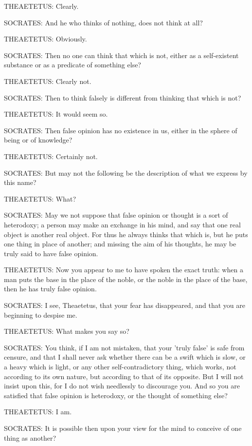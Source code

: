 THEAETETUS: Clearly.

SOCRATES: And he who thinks of nothing, does not think at all?

THEAETETUS: Obviously.

SOCRATES: Then no one can think that which is not, either as a
self-existent substance or as a predicate of something else?

THEAETETUS: Clearly not.

SOCRATES: Then to think falsely is different from thinking that which is
not?

THEAETETUS: It would seem so.

SOCRATES: Then false opinion has no existence in us, either in the
sphere of being or of knowledge?

THEAETETUS: Certainly not.

SOCRATES: But may not the following be the description of what we
express by this name?

THEAETETUS: What?

SOCRATES: May we not suppose that false opinion or thought is a sort of
heterodoxy; a person may make an exchange in his mind, and say that one
real object is another real object. For thus he always thinks that which
is, but he puts one thing in place of another; and missing the aim of
his thoughts, he may be truly said to have false opinion.

THEAETETUS: Now you appear to me to have spoken the exact truth: when a
man puts the base in the place of the noble, or the noble in the place
of the base, then he has truly false opinion.

SOCRATES: I see, Theaetetus, that your fear has disappeared, and that
you are beginning to despise me.

THEAETETUS: What makes you say so?

SOCRATES: You think, if I am not mistaken, that your 'truly false' is
safe from censure, and that I shall never ask whether there can be
a swift which is slow, or a heavy which is light, or any other
self-contradictory thing, which works, not according to its own nature,
but according to that of its opposite. But I will not insist upon this,
for I do not wish needlessly to discourage you. And so you are satisfied
that false opinion is heterodoxy, or the thought of something else?

THEAETETUS: I am.

SOCRATES: It is possible then upon your view for the mind to conceive of
one thing as another?

